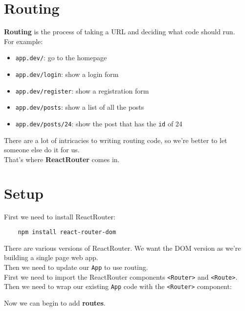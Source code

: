 \section{Routing}

\textbf{Routing} is the process of taking a URL and deciding what code should run.
\\

For example:

\begin{itemize}
    \item \texttt{app.dev/}: go to the homepage
    \item \texttt{app.dev/login}: show a login form
    \item \texttt{app.dev/register}: show a registration form
    \item \texttt{app.dev/posts}: show a list of all the posts
    \item \texttt{app.dev/posts/24}: show the post that has the \texttt{id} of 24
\end{itemize}

There are a lot of intricacies to writing routing code, so we're better to let someone else do it for us.
\\

That's where \textbf{ReactRouter} comes in.



\section{Setup}

First we need to install ReactRouter:

\begin{verbatim}
    npm install react-router-dom
\end{verbatim}

There are various versions of ReactRouter. We want the DOM version as we're building a single page web app.
\\

Then we need to update our \texttt{App} to use routing.
\\

First we need to import the ReactRouter components \texttt{<Router>} and \texttt{<Route>}. Then we need to wrap our existing \texttt{App} code with the \texttt{<Router>} component:


Now we can begin to add \textbf{routes}.


